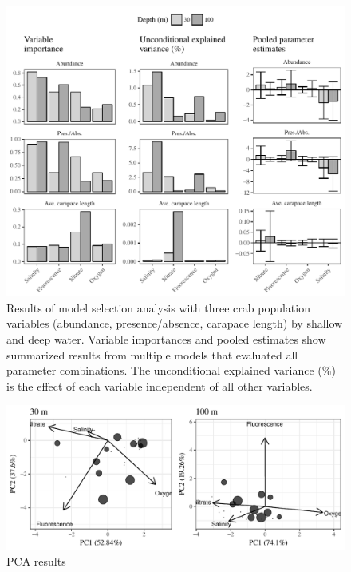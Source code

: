 \documentclass[letterpaper,12pt]{article}\usepackage[]{graphicx}\usepackage[]{color}
\makeatletter
\def\maxwidth{ %
  \ifdim\Gin@nat@width>\linewidth
    \linewidth
  \else
    \Gin@nat@width
  \fi
}
\newenvironment{knitrout}{}{} %
\makeatother
\begin{document}
\begin{knitrout}
\color{fgcolor}\begin{figure}
\includegraphics[width=\maxwidth]{figure/unnamed-chunk-5-1} \caption[Results of model selection analysis with three crab population variables (abundance, presence/absence, carapace length) by shallow and deep water]{Results of model selection analysis with three crab population variables (abundance, presence/absence, carapace length) by shallow and deep water. Variable importances and pooled estimates show summarized results from multiple models that evaluated all parameter combinations.  The unconditional explained variance (\%) is the effect of each variable independent of all other variables.}\label{fig:unnamed-chunk-5}
\end{figure}


\end{knitrout}
\clearpage

\begin{knitrout}
\color{fgcolor}\begin{figure}
\includegraphics[width=\maxwidth]{figure/unnamed-chunk-6-1} \caption[PCA results]{PCA results}\label{fig:unnamed-chunk-6}
\end{figure}


\end{knitrout}
\clearpage
\end{document}
